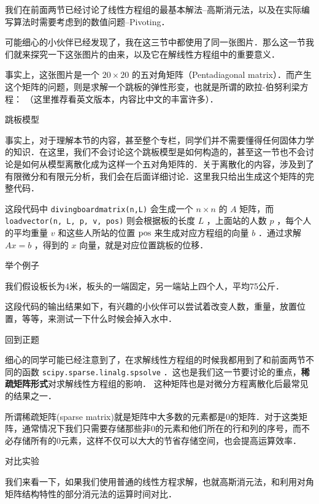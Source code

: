 
\begin{issues}
\issueDraft
\end{issues}


我们在前面两节已经讨论了线性方程组的最基本解法--高斯消元法，以及在实际编写算法时需要考虑到的数值问题--Pivoting．

可能细心的小伙伴已经发现了，我在这三节中都使用了同一张图片．那么这一节我们就来探究一下这张图片的由来，以及它在解线性方程组中的重要意义．

事实上，这张图片是一个  $20\times20$  的五对角矩阵（Pentadiagonal matrix）．而产生这个矩阵的问题，则是求解一个跳板的弹性形变，也就是所谓的欧拉-伯努利梁方程： （这里推荐看英文版本，内容比中文的丰富许多）．

跳板模型

事实上，对于理解本节的内容，甚至整个专栏，同学们并不需要懂得任何固体力学的知识．在这里，我们不会讨论这个跳板模型是如何构造的，甚至这一节也不会讨论是如何从模型离散化成为这样一个五对角矩阵的．关于离散化的内容，涉及到了有限微分和有限元分析，我们会在后面详细讨论．这里我只给出生成这个矩阵的完整代码．

这段代码中 \verb|divingboardmatrix(n,L)| 会生成一个  $n\times n$  的  $A$  矩阵，而 \verb|loadvector(n, L, p, v, pos)| 则会根据板的长度  $L$  ，上面站的人数  $p$  ，每个人的平均重量  $v$  和这些人所站的位置  $\rm{pos}$  来生成对应方程组的向量  $b$  ．通过求解  $Ax=b$  ，得到的  $x$  向量，就是对应位置跳板的位移．

举个例子

我们假设板长为4米，板头的一端固定，另一端站上四个人，平均75公斤．

这段代码的输出结果如下，有兴趣的小伙伴可以尝试着改变人数，重量，放置位置，等等，来测试一下什么时候会掉入水中．



回到正题

细心的同学可能已经注意到了，在求解线性方程组的时候我都用到了和前面两节不同的函数 \verb|scipy.sparse.linalg.spsolve| ．这也是我们这一节要讨论的重点，\textbf{稀疏矩阵形式}对求解线性方程组的影响． 这种矩阵也是对微分方程离散化后最常见的结果之一．

所谓稀疏矩阵(sparse matrix)就是矩阵中大多数的元素都是0的矩阵．对于这类矩阵，通常情况下我们只需要存储那些非0的元素和他们所在的行和列的序号，而不必存储所有的0元素，这样不仅可以大大的节省存储空间，也会提高运算效率．

对比实验

我们来看一下，如果我们使用普通的线性方程求解，也就高斯消元法，和利用对角矩阵结构特性的部分消元法的运算时间对比．

